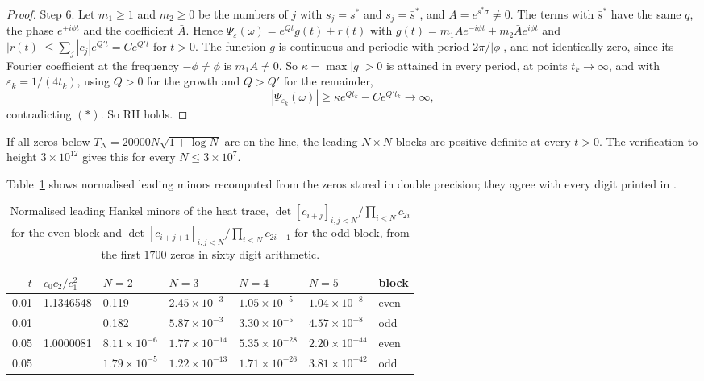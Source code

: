 \begin{proof}
Step 6. Let $m_1\ge1$ and $m_2\ge0$ be the numbers of $j$ with $s_j=s^*$ and $s_j=\bar s^*$, and $A=e^{s^*\sigma}\ne0$. The terms with $\bar s^*$ have the same $q$, the phase $e^{+i\phi t}$ and the coefficient $\bar A$. Hence $\Psi_\varepsilon(\omega)=e^{Qt}g(t)+r(t)$ with $g(t)=m_1Ae^{-i\phi t}+m_2\bar Ae^{i\phi t}$ and $|r(t)|\le\sum_j|c_j|e^{Q't}=Ce^{Q't}$ for $t>0$. The function $g$ is continuous and periodic with period $2\pi/|\phi|$, and not identically zero, since its Fourier coefficient at the frequency $-\phi\ne\phi$ is $m_1A\ne0$. So $\kappa=\max|g|>0$ is attained in every period, at points $t_k\to\infty$, and with $\varepsilon_k=1/(4t_k)$, using $Q>0$ for the growth and $Q>Q'$ for the remainder,
\[
|\Psi_{\varepsilon_k}(\omega)|\ge\kappa e^{Qt_k}-Ce^{Q't_k}\to\infty,
\]
contradicting $(*)$. So RH holds.
\end{proof}

\begin{theorem}[{\cite[Theorem 7.4]{P17}}]\label{thm:ch12:blocks}
If all zeros below $T_N=20000N\sqrt{1+\log N}$ are on the line, the leading $N\times N$ blocks are positive definite at every $t>0$. The verification to height $3\times10^{12}$ \cite{PT21} gives this for every $N\le3\times10^7$.
\end{theorem}

Table~\ref{tab:ch12:hankel} shows normalised leading minors recomputed from the zeros stored in double precision; they agree with every digit printed in \cite[Numerical observation 7.2]{P17}.

\begin{table}[htbp]
\centering\small
\begin{tabular}{rllllll}
\toprule
$t$ & $c_0c_2/c_1^2$ & $N=2$ & $N=3$ & $N=4$ & $N=5$ & block\\
\midrule
0.01 & 1.1346548 & 0.119 & $2.45\times10^{-3}$ & $1.05\times10^{-5}$ & $1.04\times10^{-8}$ & even\\
0.01 & & 0.182 & $5.87\times10^{-3}$ & $3.30\times10^{-5}$ & $4.57\times10^{-8}$ & odd\\
0.05 & 1.0000081 & $8.11\times10^{-6}$ & $1.77\times10^{-14}$ & $5.35\times10^{-28}$ & $2.20\times10^{-44}$ & even\\
0.05 & & $1.79\times10^{-5}$ & $1.22\times10^{-13}$ & $1.71\times10^{-26}$ & $3.81\times10^{-42}$ & odd\\
\bottomrule
\end{tabular}
\caption{Normalised leading Hankel minors of the heat trace, $\det[c_{i+j}]_{i,j<N}/\allowbreak\prod_{i<N}c_{2i}$ for the even block and $\det[c_{i+j+1}]_{i,j<N}/\allowbreak\prod_{i<N}c_{2i+1}$ for the odd block, from the first $1700$ zeros in sixty digit arithmetic.}
\label{tab:ch12:hankel}
\end{table}

